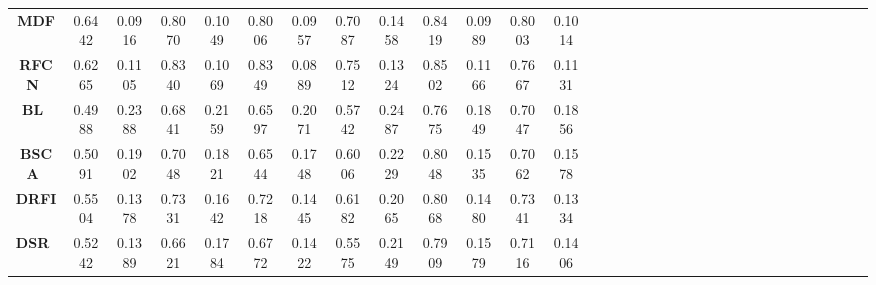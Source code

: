 \documentclass[10pt,twocolumn,letterpaper]{article}
\begin{document}
\begin{table*}
\begin{center}
\begin{tabular}{|c|c|c|c|c|c|c|c|c|c|c|c|c|c|c||c|c|c|c|c|c|c|c|c|c|c|c|c|c|c|c|c|c|c|c|c|c|c|c|c|||c|c|c|c|c|c|c|c|||}
\multicolumn{4}{|c|}{\textbf{MDF}~\cite{zhao2015saliency}}
&\multicolumn{2}{|c|}{\textcolor[rgb]{0,1,0}{0.6442}}&\multicolumn{2}{|c|}{\textcolor[rgb]{1,0,0}{0.0916}}&\multicolumn{2}{|c|}{0.8070}&\multicolumn{2}{|c|}{0.1049}&\multicolumn{2}{|c|}{0.8006}&\multicolumn{2}{|c|}{0.0957}&\multicolumn{2}{|c|}{0.7087}&\multicolumn{2}{|c|}{0.1458}&\multicolumn{2}{|c|}{0.8419}&\multicolumn{2}{|c|}{0.0989}&\multicolumn{2}{|c|}{\textcolor[rgb]{0,0,1}{0.8003}}&\multicolumn{2}{|c|}{0.1014}\\
\multicolumn{4}{|c|}{\textbf{RFCN}~\cite{wang2016saliency}}
&\multicolumn{2}{|c|}{0.6265}&\multicolumn{2}{|c|}{\textcolor[rgb]{0,0,1}{0.1105}}&\multicolumn{2}{|c|}{0.8340}&\multicolumn{2}{|c|}{0.1069}&\multicolumn{2}{|c|}{\textcolor[rgb]{0,1,0}{0.8349}}&\multicolumn{2}{|c|}{0.0889}&\multicolumn{2}{|c|}{\textcolor[rgb]{1,0,0}{0.7512}}&\multicolumn{2}{|c|}{0.1324}&\multicolumn{2}{|c|}{0.8502}&\multicolumn{2}{|c|}{0.1166}&\multicolumn{2}{|c|}{0.7667}&\multicolumn{2}{|c|}{0.1131}\\
\hline
\multicolumn{4}{|c|}{\textbf{BL}~\cite{tong2015bootstrap}}
&\multicolumn{2}{|c|}{0.4988}&\multicolumn{2}{|c|}{0.2388}&\multicolumn{2}{|c|}{0.6841}&\multicolumn{2}{|c|}{0.2159}&\multicolumn{2}{|c|}{0.6597}&\multicolumn{2}{|c|}{0.2071}&\multicolumn{2}{|c|}{0.5742}&\multicolumn{2}{|c|}{0.2487}&\multicolumn{2}{|c|}{0.7675}&\multicolumn{2}{|c|}{0.1849}&\multicolumn{2}{|c|}{0.7047}&\multicolumn{2}{|c|}{0.1856}\\
\multicolumn{4}{|c|}{\textbf{BSCA}~\cite{qin2015saliency}}
&\multicolumn{2}{|c|}{0.5091}&\multicolumn{2}{|c|}{0.1902}&\multicolumn{2}{|c|}{0.7048}&\multicolumn{2}{|c|}{0.1821}&\multicolumn{2}{|c|}{0.6544}&\multicolumn{2}{|c|}{0.1748}&\multicolumn{2}{|c|}{0.6006}&\multicolumn{2}{|c|}{0.2229}&\multicolumn{2}{|c|}{0.8048}&\multicolumn{2}{|c|}{0.1535}&\multicolumn{2}{|c|}{0.7062}&\multicolumn{2}{|c|}{0.1578}\\
\multicolumn{4}{|c|}{\textbf{DRFI}~\cite{jiang2013salient}}
&\multicolumn{2}{|c|}{0.5504}&\multicolumn{2}{|c|}{0.1378}&\multicolumn{2}{|c|}{0.7331}&\multicolumn{2}{|c|}{0.1642}&\multicolumn{2}{|c|}{0.7218}&\multicolumn{2}{|c|}{0.1445}&\multicolumn{2}{|c|}{0.6182}&\multicolumn{2}{|c|}{0.2065}&\multicolumn{2}{|c|}{0.8068}&\multicolumn{2}{|c|}{0.1480}&\multicolumn{2}{|c|}{0.7341}&\multicolumn{2}{|c|}{0.1334}\\
\multicolumn{4}{|c|}{\textbf{DSR}~\cite{li2013saliency}}
&\multicolumn{2}{|c|}{0.5242}&\multicolumn{2}{|c|}{0.1389}&\multicolumn{2}{|c|}{0.6621}&\multicolumn{2}{|c|}{0.1784}&\multicolumn{2}{|c|}{0.6772}&\multicolumn{2}{|c|}{0.1422}&\multicolumn{2}{|c|}{0.5575}&\multicolumn{2}{|c|}{0.2149}&\multicolumn{2}{|c|}{0.7909}&\multicolumn{2}{|c|}{0.1579}&\multicolumn{2}{|c|}{0.7116}&\multicolumn{2}{|c|}{0.1406}\\

\end{tabular}
\end{center}
\end{table*}
\end{document}
